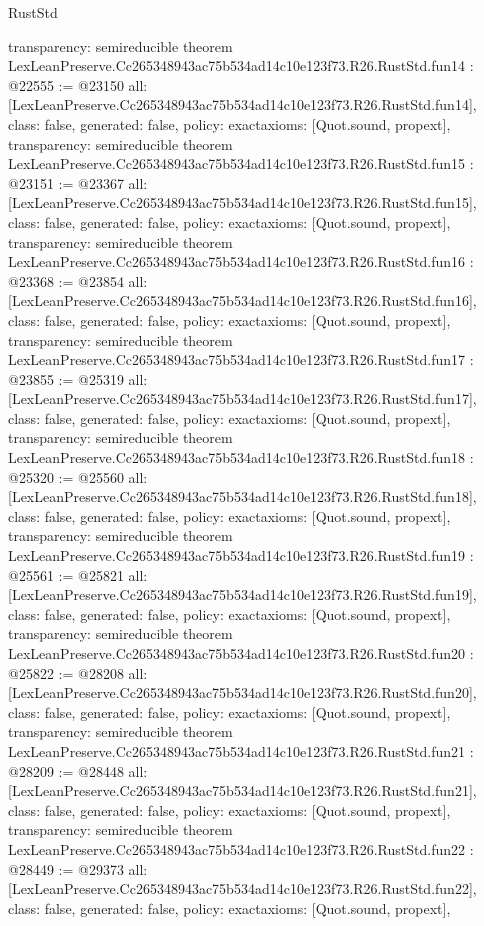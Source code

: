 \begin{lexlean}{RustStd}
\begin{coremodule}
{  transparency: semireducible
}
theorem LexLeanPreserve.Cc265348943ac75b534ad14c10e123f73.R26.RustStd.fun14 : @22555 := @23150 {
  all: [LexLeanPreserve.Cc265348943ac75b534ad14c10e123f73.R26.RustStd.fun14],
  class: false,
  generated: false,
  policy: exact{axioms: [Quot.sound, propext]},
  transparency: semireducible
}
theorem LexLeanPreserve.Cc265348943ac75b534ad14c10e123f73.R26.RustStd.fun15 : @23151 := @23367 {
  all: [LexLeanPreserve.Cc265348943ac75b534ad14c10e123f73.R26.RustStd.fun15],
  class: false,
  generated: false,
  policy: exact{axioms: [Quot.sound, propext]},
  transparency: semireducible
}
theorem LexLeanPreserve.Cc265348943ac75b534ad14c10e123f73.R26.RustStd.fun16 : @23368 := @23854 {
  all: [LexLeanPreserve.Cc265348943ac75b534ad14c10e123f73.R26.RustStd.fun16],
  class: false,
  generated: false,
  policy: exact{axioms: [Quot.sound, propext]},
  transparency: semireducible
}
theorem LexLeanPreserve.Cc265348943ac75b534ad14c10e123f73.R26.RustStd.fun17 : @23855 := @25319 {
  all: [LexLeanPreserve.Cc265348943ac75b534ad14c10e123f73.R26.RustStd.fun17],
  class: false,
  generated: false,
  policy: exact{axioms: [Quot.sound, propext]},
  transparency: semireducible
}
theorem LexLeanPreserve.Cc265348943ac75b534ad14c10e123f73.R26.RustStd.fun18 : @25320 := @25560 {
  all: [LexLeanPreserve.Cc265348943ac75b534ad14c10e123f73.R26.RustStd.fun18],
  class: false,
  generated: false,
  policy: exact{axioms: [Quot.sound, propext]},
  transparency: semireducible
}
theorem LexLeanPreserve.Cc265348943ac75b534ad14c10e123f73.R26.RustStd.fun19 : @25561 := @25821 {
  all: [LexLeanPreserve.Cc265348943ac75b534ad14c10e123f73.R26.RustStd.fun19],
  class: false,
  generated: false,
  policy: exact{axioms: [Quot.sound, propext]},
  transparency: semireducible
}
theorem LexLeanPreserve.Cc265348943ac75b534ad14c10e123f73.R26.RustStd.fun20 : @25822 := @28208 {
  all: [LexLeanPreserve.Cc265348943ac75b534ad14c10e123f73.R26.RustStd.fun20],
  class: false,
  generated: false,
  policy: exact{axioms: [Quot.sound, propext]},
  transparency: semireducible
}
theorem LexLeanPreserve.Cc265348943ac75b534ad14c10e123f73.R26.RustStd.fun21 : @28209 := @28448 {
  all: [LexLeanPreserve.Cc265348943ac75b534ad14c10e123f73.R26.RustStd.fun21],
  class: false,
  generated: false,
  policy: exact{axioms: [Quot.sound, propext]},
  transparency: semireducible
}
theorem LexLeanPreserve.Cc265348943ac75b534ad14c10e123f73.R26.RustStd.fun22 : @28449 := @29373 {
  all: [LexLeanPreserve.Cc265348943ac75b534ad14c10e123f73.R26.RustStd.fun22],
  class: false,
  generated: false,
  policy: exact{axioms: [Quot.sound, propext]},
}
\end{coremodule}
\end{lexlean}
